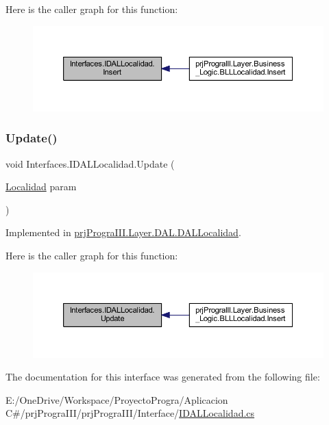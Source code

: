 Here is the caller graph for this function\+:
\nopagebreak
\begin{figure}[H]
\begin{center}
\leavevmode
\includegraphics[width=350pt]{interface_interfaces_1_1_i_d_a_l_localidad_a777e6b126a740cc546824c33af5ebd99_icgraph}
\end{center}
\end{figure}
\hypertarget{interface_interfaces_1_1_i_d_a_l_localidad_a42a1b56da7dcc40c2843e0ecd2287347}{}\label{interface_interfaces_1_1_i_d_a_l_localidad_a42a1b56da7dcc40c2843e0ecd2287347} 
\subsubsection{\texorpdfstring{Update()}{Update()}}
{\footnotesize\ttfamily void Interfaces.\+I\+D\+A\+L\+Localidad.\+Update (\begin{DoxyParamCaption}\item[{\hyperlink{classprj_progra_i_i_i_1_1_layer_1_1_entities_1_1_localidad}{Localidad}}]{param }\end{DoxyParamCaption})}



Implemented in \hyperlink{classprj_progra_i_i_i_1_1_layer_1_1_d_a_l_1_1_d_a_l_localidad_a6d28e0253b702b4cd246f15bda5505eb}{prj\+Progra\+I\+I\+I.\+Layer.\+D\+A\+L.\+D\+A\+L\+Localidad}.

Here is the caller graph for this function\+:
\nopagebreak
\begin{figure}[H]
\begin{center}
\leavevmode
\includegraphics[width=350pt]{interface_interfaces_1_1_i_d_a_l_localidad_a42a1b56da7dcc40c2843e0ecd2287347_icgraph}
\end{center}
\end{figure}


The documentation for this interface was generated from the following file\+:\begin{DoxyCompactItemize}
\item 
E\+:/\+One\+Drive/\+Workspace/\+Proyecto\+Progra/\+Aplicacion C\#/prj\+Progra\+I\+I\+I/prj\+Progra\+I\+I\+I/\+Interface/\hyperlink{_i_d_a_l_localidad_8cs}{I\+D\+A\+L\+Localidad.\+cs}\end{DoxyCompactItemize}
